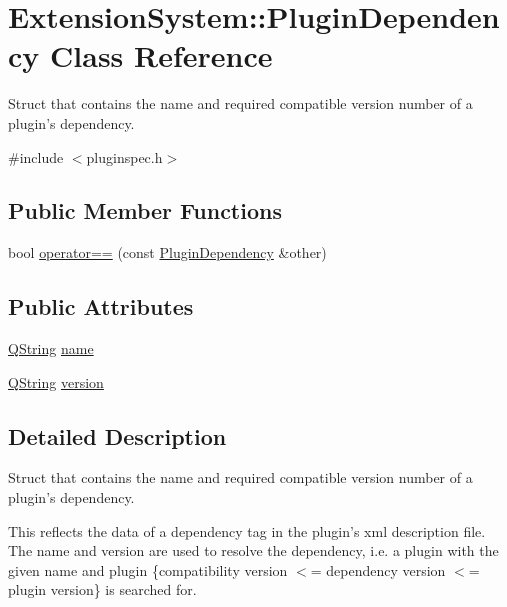 \hypertarget{struct_extension_system_1_1_plugin_dependency}{\section{\-Extension\-System\-:\-:\-Plugin\-Dependency \-Class \-Reference}
\label{struct_extension_system_1_1_plugin_dependency}
}


\-Struct that contains the name and required compatible version number of a plugin's dependency.  




{\ttfamily \#include $<$pluginspec.\-h$>$}

\subsection*{\-Public \-Member \-Functions}
\begin{DoxyCompactItemize}
\item 
bool \hyperlink{struct_extension_system_1_1_plugin_dependency_a241605ff225f90b4be7cd83dc9e30828}{operator==} (const \hyperlink{struct_extension_system_1_1_plugin_dependency}{\-Plugin\-Dependency} \&other)
\end{DoxyCompactItemize}
\subsection*{\-Public \-Attributes}
\begin{DoxyCompactItemize}
\item 
\hyperlink{group___u_a_v_objects_plugin_gab9d252f49c333c94a72f97ce3105a32d}{\-Q\-String} \hyperlink{struct_extension_system_1_1_plugin_dependency_acd2cf6b00e6408b5fe155340a8159183}{name}
\item 
\hyperlink{group___u_a_v_objects_plugin_gab9d252f49c333c94a72f97ce3105a32d}{\-Q\-String} \hyperlink{struct_extension_system_1_1_plugin_dependency_a2d00bf5564134af5cb2eeddf2074eee8}{version}
\end{DoxyCompactItemize}


\subsection{\-Detailed \-Description}
\-Struct that contains the name and required compatible version number of a plugin's dependency. 

\-This reflects the data of a dependency tag in the plugin's xml description file. \-The name and version are used to resolve the dependency, i.\-e. a plugin with the given name and plugin {\ttfamily \{compatibility} version $<$= dependency version $<$= plugin version\} is searched for.

